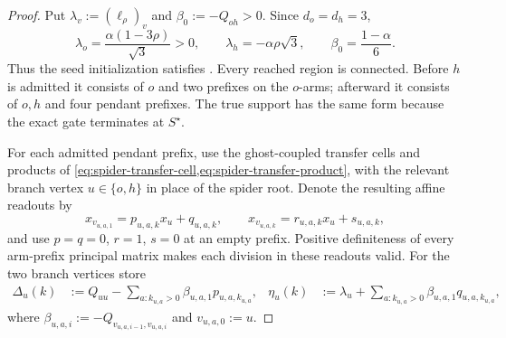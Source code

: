 \begin{proof}
Put $\lambda_v:=(\ell_\rho)_v$ and $\beta_0:=-Q_{oh}>0$.  Since
$d_o=d_h=3$,
\begin{equation*}
 \lambda_o=\frac{\alpha(1-3\rho)}{\sqrt3}>0,
 \qquad
 \lambda_h=-\alpha\rho\sqrt3,
 \qquad
 \beta_0=\frac{1-\alpha}{6}.
\end{equation*}
Thus the seed initialization satisfies
.  Every reached region is connected.  Before
$h$ is admitted it consists of $o$ and two prefixes on the $o$-arms; afterward
it consists of $o,h$ and four pendant prefixes.  The true support has the same
form because the exact gate terminates at $S^\star$.

For each admitted pendant prefix, use the ghost-coupled transfer cells and
products of
\cref{eq:spider-transfer-cell,eq:spider-transfer-product}, with the relevant
branch vertex $u\in\{o,h\}$ in place of the spider root.  Denote the resulting
affine readouts by
\begin{equation*}
 x_{v_{u,a,1}}=p_{u,a,k}x_u+q_{u,a,k},
 \qquad
 x_{v_{u,a,k}}=r_{u,a,k}x_u+s_{u,a,k},
\end{equation*}
and use $p=q=0$, $r=1$, $s=0$ at an empty prefix.  Positive definiteness of
every arm-prefix principal matrix makes each division in these readouts valid.
For the two branch vertices store
\begin{align}
 \Delta_u(k)
 &:=Q_{uu}-\sum_{a:k_{u,a}>0}
      \beta_{u,a,1}p_{u,a,k_{u,a}},
 &
 \eta_u(k)
 &:=\lambda_u+\sum_{a:k_{u,a}>0}
      \beta_{u,a,1}q_{u,a,k_{u,a}},
 \label{eq:double-y-branch-aggregates}
\end{align}
where $\beta_{u,a,i}:=-Q_{v_{u,a,i-1},v_{u,a,i}}$ and
$v_{u,a,0}:=u$.


\end{proof}
